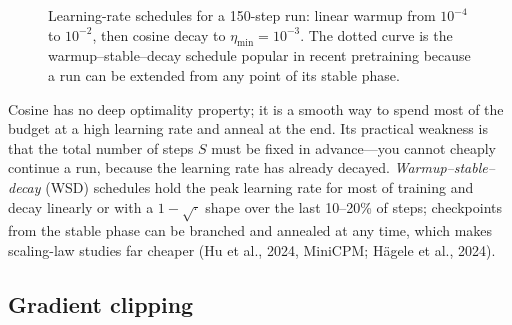 \begin{figure}[t]
\centering
{}
\caption{Learning-rate schedules for a 150-step run: linear warmup from $10^{-4}$ to
$10^{-2}$, then cosine decay to $\eta_{\min}=10^{-3}$. The dotted curve is the
warmup--stable--decay schedule popular in recent pretraining because a run can be extended
from any point of its stable phase.}
\label{fig:pretrain:schedule}
\end{figure}

\begin{deepdive}
Cosine has no deep optimality property; it is a smooth way to spend most of the budget at a
high learning rate and anneal at the end. Its practical weakness is that the total number of
steps $S$ must be fixed in advance---you cannot cheaply continue a run, because the learning
rate has already decayed. \emph{Warmup--stable--decay} (WSD) schedules hold the peak learning
rate for most of training and decay linearly or with a $1-\sqrt{\cdot}$ shape over the last
10--20\% of steps; checkpoints from the stable phase can be branched and annealed at any time,
which makes scaling-law studies far cheaper (Hu et al., 2024, MiniCPM; H\"agele et al., 2024).
\end{deepdive}

\subsection{Gradient clipping}\label{sec:pretrain:clip}

